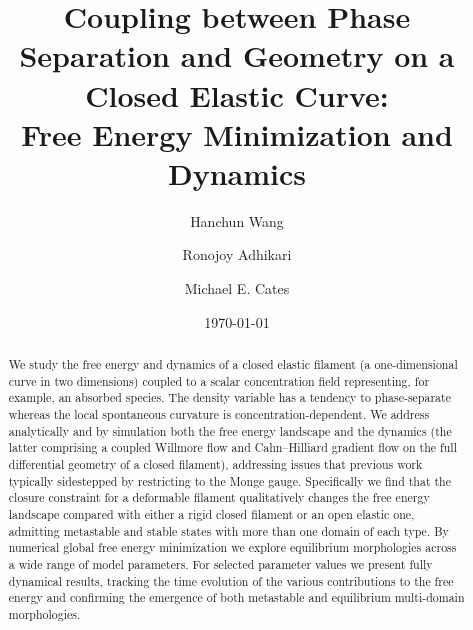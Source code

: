 \documentclass[
aip,
jcp,
reprint, 
floatfix
]{revtex4-1}
\begin{document}

\title{Coupling between Phase Separation and Geometry on a Closed Elastic Curve:\\
Free Energy Minimization and Dynamics}

\author{Hanchun Wang}
\author{Ronojoy Adhikari}
\author{Michael E. Cates}
\date{\today}
\begin{abstract}
\noindent
We study the free energy and dynamics of a closed elastic filament (a one-dimensional curve in two dimensions) coupled to a scalar concentration field representing, for example, an absorbed species. The density variable has a tendency to phase-separate whereas the local spontaneous curvature is concentration-dependent. We address analytically and by simulation both the free energy landscape and the dynamics (the latter
comprising a coupled Willmore flow and Cahn--Hilliard gradient flow on the full differential geometry of a closed filament), addressing issues that previous work typically sidestepped by restricting to the Monge gauge. Specifically we find that the closure constraint for a deformable filament qualitatively changes the free energy landscape compared with either a rigid closed filament or an open elastic one, admitting metastable and stable states with more than one domain of each type. By numerical global free energy minimization we explore equilibrium morphologies across a wide range of model parameters. For selected parameter values we present fully dynamical results, tracking the time evolution of the various contributions to the free energy and confirming the emergence of both metastable and equilibrium multi-domain morphologies.

\end{abstract}

\maketitle
\end{document}
